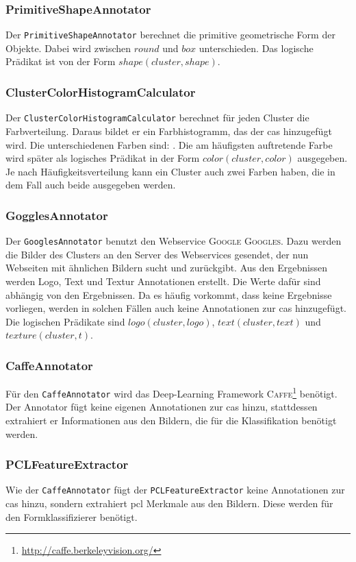 \subsubsection{PrimitiveShapeAnnotator} 
Der \texttt{PrimitiveShapeAnnotator} berechnet die primitive geometrische Form der Objekte.  Dabei wird zwischen $round$ und $box$ unterschieden. Das logische Prädikat ist von der Form $shape(cluster,  shape)$.
   
\subsubsection{ClusterColorHistogramCalculator}
Der \texttt{ClusterColorHistogramCalculator} berechnet für jeden Cluster die Farbverteilung. Daraus bildet er ein Farbhistogramm, das der \gls{cas} hinzugefügt wird. Die unterschiedenen Farben sind: . Die am häufigsten auftretende Farbe wird später als logisches Prädikat in der Form $color(cluster,  color)$ ausgegeben. Je nach Häufigkeitsverteilung kann ein Cluster auch zwei Farben haben, die in dem Fall auch beide ausgegeben werden. 

\subsubsection{GogglesAnnotator}
Der \texttt{GooglesAnnotator} benutzt den Webservice \textsc{Google Googles}. Dazu werden die Bilder des Clusters an den Server des Webservices gesendet, der nun Webseiten mit ähnlichen Bildern sucht und zurückgibt. Aus den Ergebnissen werden Logo, Text und Textur Annotationen erstellt. Die Werte dafür sind abhängig von den Ergebnissen. Da es häufig vorkommt, dass keine Ergebnisse vorliegen, werden in solchen Fällen auch keine Annotationen zur \gls{cas} hinzugefügt. Die logischen Prädikate sind $logo(cluster, logo)$, $text(cluster, text)$ und $texture(cluster, t)$. 

\subsubsection{CaffeAnnotator}
Für den \texttt{CaffeAnnotator} wird das Deep-Learning Framework \textsc{Caffe}\footnote{\url{http://caffe.berkeleyvision.org/}} benötigt. Der Annotator fügt keine eigenen Annotationen zur \gls{cas} hinzu, stattdessen extrahiert er Informationen aus den Bildern, die für die Klassifikation benötigt werden.  

\subsubsection{PCLFeatureExtractor}
Wie der \texttt{CaffeAnnotator} fügt der \texttt{PCLFeatureExtractor} keine Annotationen zur \gls{cas} hinzu, sondern extrahiert \gls{pcl} Merkmale aus den Bildern. Diese werden für den Formklassifizierer benötigt.

